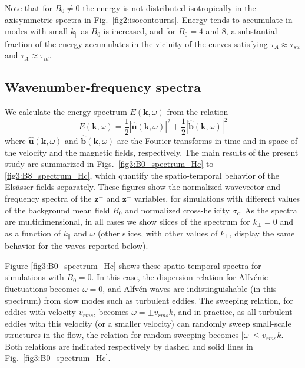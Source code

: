\documentclass[aip,pop,reprint,amsmath,amssymb,floatfix]{revtex4-1}
\let\oldhat\hat
\renewcommand{\vec}[1]{\mathbf{#1}}
\renewcommand{\hat}[1]{\oldhat{\mathbf{#1}}}
\begin{document}
Note that for $B_0 \neq 0$ the energy is not distributed isotropically
in the axisymmetric spectra in Fig.~\ref{fig2:isocontourns}. Energy
tends to accumulate in modes with small $k_\parallel$ as $B_0$ is
increased, and for $B_0=4$ and 8, a substantial fraction of the energy
accumulates in the vicinity of the curves satisfying $\tau_A \approx
\tau_{sw}$ and $\tau_A \approx \tau_{nl}$.

\subsection{Wavenumber-frequency spectra}\label{sec:wk}

We calculate the energy spectrum $E(\vec{k}, \omega)$ from the relation
\begin{equation}
  E(\vec{k}, \omega) = \frac{1}{2} \left|\hat{u}(\vec{k},
  \omega)\right|^2 + \frac{1}{2} \left|\hat{b}(\vec{k},
  \omega)\right|^2
\end{equation}
where $\hat{u}(\vec{k}, \omega)$ and $\hat{b}(\vec{k}, \omega)$ are
the Fourier transforms in time and in space of the velocity and the
magnetic fields, respectively.  The main results of the present study
are summarized in Figs.~\ref{fig3:B0_spectrum_Hc} to
\ref{fig3:B8_spectrum_Hc}, which quantify the spatio-temporal behavior
of the Els\"asser fields separately. These figures show the normalized
wavevector and frequency spectra of the $\vec{z}^+$ and $\vec{z}^-$
variables, for simulations with different values of the background
mean field $B_0$ and normalized cross-helicity $\sigma_c$. As the
spectra are multidimensional, in all cases we show slices of the
spectrum for $k_\perp=0$ and as a function of $k_\parallel$ and
$\omega$ (other slices, with other values of $k_\perp$, display the
same behavior for the waves reported below).

Figure \ref{fig3:B0_spectrum_Hc} shows these spatio-temporal spectra
for simulations with $B_0=0$. In this case, the dispersion relation
for Alfv\'enic fluctuations becomes $\omega=0$, and Alfv\'en waves are
indistinguishable (in this spectrum) from slow modes such as turbulent
eddies. The sweeping relation, for eddies with velocity $v_{rms}$,
becomes $\omega=\pm v_{rms} k$, and in practice, as all turbulent
eddies with this velocity (or a smaller velocity) can randomly sweep
small-scale structures in the flow, the relation for random sweeping
becomes $|\omega| \leq v_{rms} k$. Both relations are indicated
respectively by dashed and solid lines in
Fig.~\ref{fig3:B0_spectrum_Hc}.
\end{document}
